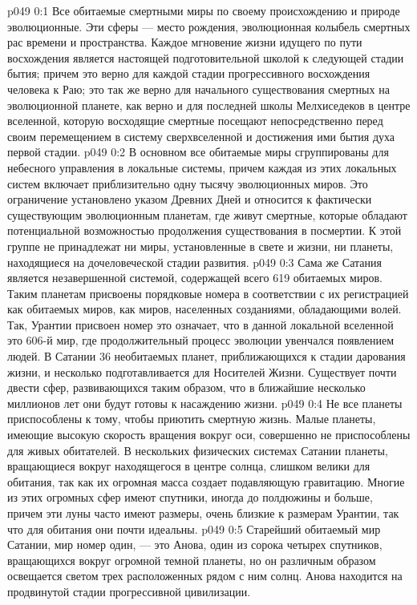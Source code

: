 \author{Мелхиседек}
\vs p049 0:1 Все обитаемые смертными миры по своему происхождению и природе эволюционные. Эти сферы --- место рождения, эволюционная колыбель смертных рас времени и пространства. Каждое мгновение жизни идущего по пути восхождения является настоящей подготовительной школой к следующей стадии бытия; причем это верно для каждой стадии прогрессивного восхождения человека к Раю; это так же верно для начального существования смертных на эволюционной планете, как верно и для последней школы Мелхиседеков в центре вселенной, которую восходящие смертные посещают непосредственно перед своим перемещением в систему сверхвселенной и достижения ими бытия духа первой стадии.
\vs p049 0:2 \pc В основном все обитаемые миры сгруппированы для небесного управления в локальные системы, причем каждая из этих локальных систем включает приблизительно одну тысячу эволюционных миров. Это ограничение установлено указом Древних Дней и относится к фактически существующим эволюционным планетам, где живут смертные, которые обладают потенциальной возможностью продолжения существования в посмертии. К этой группе не принадлежат ни миры, установленные в свете и жизни, ни планеты, находящиеся на дочеловеческой стадии развития.
\vs p049 0:3 \pc Сама же Сатания является незавершенной системой, содержащей всего 619 обитаемых миров. Таким планетам присвоены порядковые номера в соответствии с их регистрацией как обитаемых миров, как миров, населенных созданиями, обладающими волей. Так, Урантии присвоен номер  это означает, что в данной локальной вселенной это 606\hyp{}й мир, где продолжительный процесс эволюции увенчался появлением людей. В Сатании 36 необитаемых планет, приближающихся к стадии дарования жизни, и несколько подготавливается для Носителей Жизни. Существует почти двести сфер, развивающихся таким образом, что в ближайшие несколько миллионов лет они будут готовы к насаждению жизни.
\vs p049 0:4 Не все планеты приспособлены к тому, чтобы приютить смертную жизнь. Малые планеты, имеющие высокую скорость вращения вокруг оси, совершенно не приспособлены для живых обитателей. В нескольких физических системах Сатании планеты, вращающиеся вокруг находящегося в центре солнца, слишком велики для обитания, так как их огромная масса создает подавляющую гравитацию. Многие из этих огромных сфер имеют спутники, иногда до полдюжины и больше, причем эти луны часто имеют размеры, очень близкие к размерам Урантии, так что для обитания они почти идеальны.
\vs p049 0:5 Старейший обитаемый мир Сатании, мир номер один, --- это Анова, один из сорока четырех спутников, вращающихся вокруг огромной темной планеты, но он различным образом освещается светом трех расположенных рядом с ним солнц. Анова находится на продвинутой стадии прогрессивной цивилизации.

